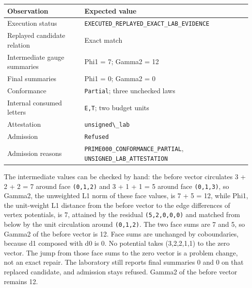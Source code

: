 \documentclass[
  11pt,
]{article}
\newcommand{\passthrough}[1]{#1}
\begin{document}
\begin{longtable}[]{@{}
  >{\raggedright\arraybackslash}p{}
  >{\raggedright\arraybackslash}p{}@{}}
\toprule\noalign{}
\begin{minipage}[b]{\linewidth}\raggedright
Observation
\end{minipage} & \begin{minipage}[b]{\linewidth}\raggedright
Expected value
\end{minipage} \\
\midrule\noalign{}
\endhead
\bottomrule\noalign{}
\endlastfoot
Execution status & \nolinkurl{EXECUTED_REPLAYED_EXACT_LAB_EVIDENCE} \\
Replayed candidate relation & Exact match \\
Intermediate gauge summaries & Phi1 = 7; Gamma2 = 12 \\
Final summaries & Phi1 = 0; Gamma2 = 0 \\
Conformance & \passthrough{\lstinline!Partial!}; three unchecked laws \\
Internal consumed letters & \passthrough{\lstinline!E,T!}; two budget
units \\
Attestation & \passthrough{\lstinline!unsigned\_lab!} \\
Admission & \passthrough{\lstinline!Refused!} \\
Admission reasons & \nolinkurl{PRIME000_CONFORMANCE_PARTIAL},
\nolinkurl{UNSIGNED_LAB_ATTESTATION} \\
\end{longtable}

The intermediate values can be checked by hand: the before vector
circulates 3 + 2 + 2 = 7 around face \passthrough{\lstinline!(0,1,2)!}
and 3 + 1 + 1 = 5 around face \passthrough{\lstinline!(0,1,3)!}, so
Gamma2, the unweighted L1 norm of these face values, is 7 + 5 = 12,
while Phi1, the unit-weight L1 distance from the before vector to the
edge differences of vertex potentials, is 7, attained by the residual
\passthrough{\lstinline!(5,2,0,0,0)!} and matched from below by the unit
circulation around \passthrough{\lstinline!(0,1,2)!}. The two face sums
are 7 and 5, so Gamma2 of the before vector is 12. Face sums are
unchanged by coboundaries, because d1 composed with d0 is 0. No
potential takes (3,2,2,1,1) to the zero vector. The jump from those face
sums to the zero vector is a problem change, not an exact repair. The
laboratory still reports final summaries 0 and 0 on that replaced
candidate, and admission stays refused. Gamma2 of the before vector
remains 12.
\end{document}
